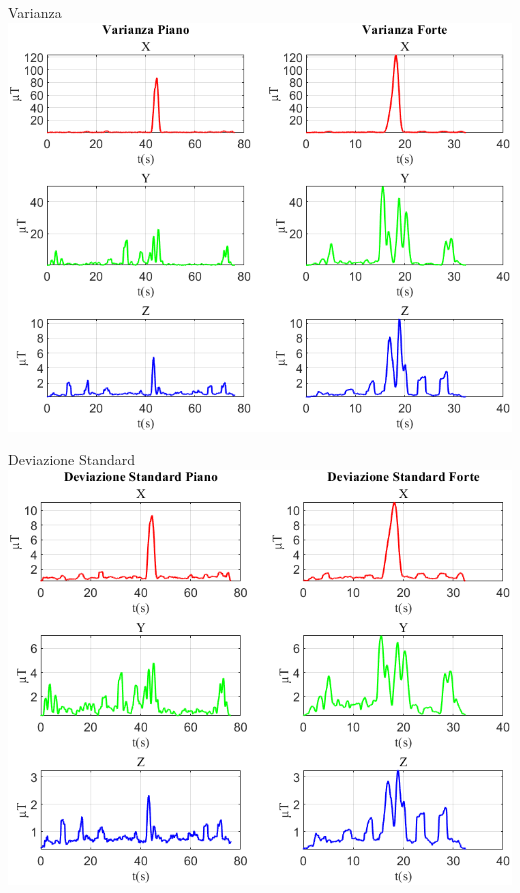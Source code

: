 	\begin{frame}{{Varianza}}
		\centering\includegraphics[height=.8\textheight]{figure/Mag/Varianza}
	\end{frame}
	
	\begin{frame}{{Deviazione Standard}}
		\centering\includegraphics[height=.8\textheight]{figure/Mag/Deviazione Standard}
	\end{frame}
	

